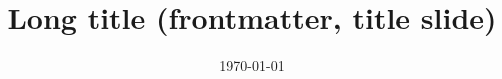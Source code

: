 

\title%
[Short title (footer)]%
{Long title (frontmatter, title slide)}%



\author%
[Dimitris Floros]%
{%
}


\date%
[\today]%
{\today}
